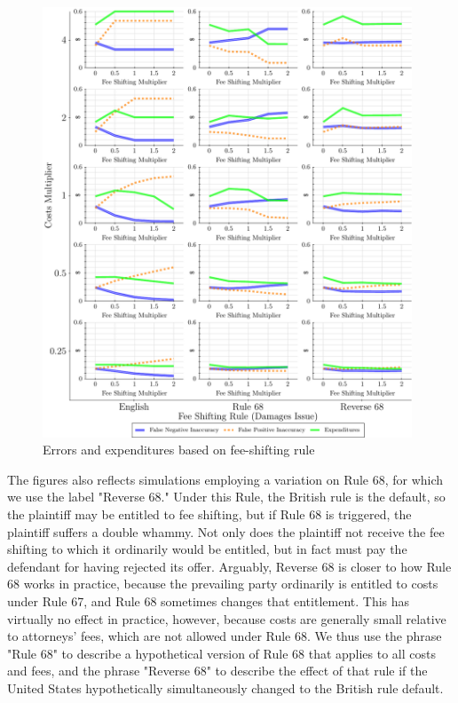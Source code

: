 \documentclass{article}
\begin{document}
\begin{figure}
\begin{minipage}{0.48\textwidth}
        \includegraphics[width=0.98\textwidth, scale=0.70, trim={0in 0in 0in 0in}, clip]{../Figures/Accuracy and Expenditures Varying Fee Shifting Rule (Damages Issue)} %
        \caption{Errors and expenditures based on fee-shifting rule}
		\label{fig:accexp_damagesrule}
    \end{minipage}
\end{figure}

The figures also reflects simulations employing a variation on Rule 68, for which we use the label "Reverse 68." Under this Rule, the British rule is the default, so the plaintiff may be entitled to fee shifting, but if Rule 68 is triggered, the plaintiff suffers a double whammy. Not only does the plaintiff not receive the fee shifting to which it ordinarily would be entitled, but in fact must pay the defendant for having rejected its offer. Arguably, Reverse 68 is closer to how Rule 68 works in practice, because the prevailing party ordinarily is entitled to costs under Rule 67, and Rule 68 sometimes changes that entitlement. This has virtually no effect in practice, however, because costs are generally small relative to attorneys' fees, which are not allowed under Rule 68. We thus use the phrase "Rule 68" to describe a hypothetical version of Rule 68 that applies to all costs and fees, and the phrase "Reverse 68" to describe the effect of that rule if the United States hypothetically simultaneously changed to the British rule default.
\end{document}
